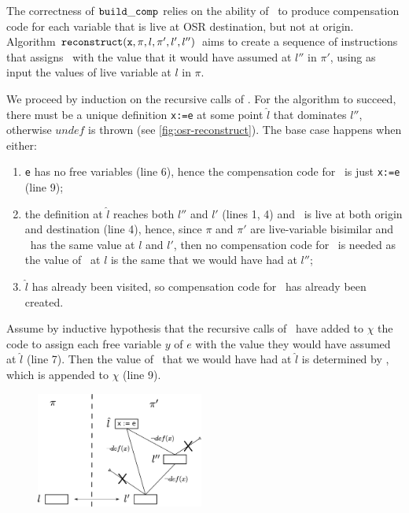 \begin{myproof}
The correctness of ${\tt build\_comp}$ relies on the ability of \reconstruct\ to produce compensation code for each variable that is live at OSR destination, but not at origin. Algorithm $\text{${\tt reconstruct}$}(\text{${\tt x}$}, \pi, l, \pi', l', l'')$ aims to create a sequence of instructions that assigns \wx\ with the value that it would have assumed at $l''$ in $\pi'$, using as input the values of live variable at $l$ in $\pi$.

We proceed by induction on the recursive calls of \reconstruct. For the algorithm to succeed, there must be a unique definition {\tt x:=e} at some point $\hat{l}$ that dominates $l''$, otherwise $undef$ is thrown (see \myfigure\ref{fig:osr-reconstruct}). %
The base case happens when either:
\begin{enumerate}[itemsep=3pt, parsep=0pt]
 \item {\tt e} has no free variables (line 6), hence the compensation code for \wx\ is just {\tt x:=e} (line 9);
 \item the definition at $\hat{l}$ reaches both $l''$ and $l'$ (lines 1, 4) and \wx\ is live at both origin and destination (line 4), hence, since $\pi$ and $\pi'$ are live-variable bisimilar and \wx\ has the same value at $l$ and $l'$, then no compensation code for \wx\ is needed as the value of \wx\ at $l$ is the same that we would have had at $l''$;
 \item $\hat{l}$ has already been visited, so compensation code for \wx\ has already been created.
\end{enumerate}

\noindent Assume by inductive hypothesis that the recursive calls of \reconstruct\ have added to $\chi$ the code to assign each free variable $y$ of $e$ with the value they would have assumed at $\hat{l}$ (line 7). Then the value of \wx\ that we would have had at $\hat{l}$ is determined by , which is appended to $\chi$ (line 9).
\end{myproof}

\ifdefined\noauthorea
\begin{figure}[!ht]
\begin{center}
\includegraphics[width=0.49\textwidth]{figures/osr-reconstruct/osr-reconstruct.eps}
\caption{\protect}
\end{center}
\end{figure}
\fi

